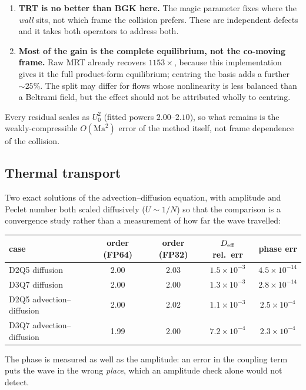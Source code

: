 \documentclass[11pt,a4paper]{article}
\begin{document}
\begin{enumerate}[leftmargin=1.4em,itemsep=3pt]
\item \textbf{TRT is no better than BGK here.} The magic parameter fixes where the
  \emph{wall} sits, not which frame the collision prefers. These are independent
  defects and it takes both operators to address both.
\item \textbf{Most of the gain is the complete equilibrium, not the co-moving
  frame.} Raw MRT already recovers $1153\times$, because this implementation gives
  it the full product-form equilibrium; centring the basis adds a further $\sim25\%$.
  The split may differ for flows whose nonlinearity is less balanced than a
  Beltrami field, but the effect should not be attributed wholly to centring.
\end{enumerate}

\noindent Every residual scales as $U_0^2$ (fitted powers $2.00$--$2.10$), so what
remains is the weakly-compressible $O(\mathrm{Ma}^2)$ error of the method itself,
not frame dependence of the collision.


\subsection{Thermal transport}

Two exact solutions of the advection--diffusion equation, with amplitude and
Peclet number both scaled diffusively ($U\sim1/N$) so that the comparison is a
convergence study rather than a measurement of how far the wave travelled:

\begin{center}\small
\begin{tabular}{lcccc}
\toprule
case & order (FP64) & order (FP32) & $D_{\rm eff}$ rel.\ err & phase err \\
\midrule
D2Q5 diffusion            & 2.00 & 2.03 & $1.5\times10^{-3}$ & $4.5\times10^{-14}$ \\
D3Q7 diffusion            & 2.00 & 2.00 & $1.3\times10^{-3}$ & $2.8\times10^{-14}$ \\
D2Q5 advection--diffusion & 2.00 & 2.02 & $1.1\times10^{-3}$ & $2.5\times10^{-4}$ \\
D3Q7 advection--diffusion & 1.99 & 2.00 & $7.2\times10^{-4}$ & $2.3\times10^{-4}$ \\
\bottomrule
\end{tabular}
\end{center}

\noindent The phase is measured as well as the amplitude: an error in the
coupling term puts the wave in the wrong \emph{place}, which an amplitude check
alone would not detect.
\end{document}
